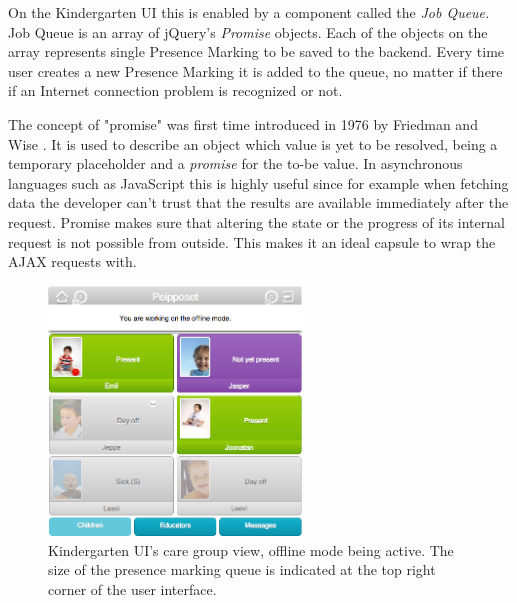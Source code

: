 On the Kindergarten UI this is enabled by a component called the \textit{Job Queue.} Job Queue is an array of jQuery's \textit{Promise} objects. Each of the objects on the array represents single Presence Marking to be saved to the backend. Every time user creates a new Presence Marking it is added to the queue, no matter if there if an Internet connection problem is recognized or not.


The concept of "promise" was first time introduced in 1976 by Friedman and Wise \cite{friedman_impact_1976}. It is used to describe an object which value is yet to be resolved, being a temporary placeholder and a \textit{promise} for the to-be value. In asynchronous languages such as JavaScript this is highly useful since for example when fetching data the developer can't trust that the results are available immediately after the request. Promise makes sure that altering the state or the progress of its internal request is not possible from outside. This makes it an ideal capsule to wrap the AJAX requests with. \cite{_deferred.promise_????} %

\begin{figure}[t]
\begin{center}
\includegraphics[width=0.6\textwidth]{assets/offline-ui.png}
\end{center}
\caption{Kindergarten UI's care group view, offline mode being active. The size of the presence marking queue is indicated at the top right corner of the user interface.}
\label{fig:offline-ui}
\end{figure}


